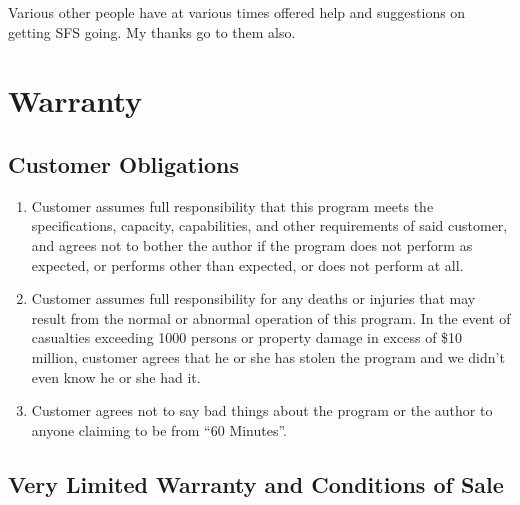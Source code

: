 Various other people have at various times offered help and suggestions on
getting SFS going.  My thanks go to them also.


\section{Warranty}

\subsection{Customer Obligations}

\begin{enumerate}

\item Customer assumes full responsibility that this program meets the
     specifications, capacity, capabilities, and other requirements of said
     customer, and agrees not to bother the author if the program does not
     perform as expected, or performs other than expected, or does not perform
     at all.

\item Customer assumes full responsibility for any deaths or injuries that may
     result from the normal or abnormal operation of this program.  In the
     event of casualties exceeding 1000 persons or property damage in excess of
     \$10 million, customer agrees that he or she has stolen the program and we
     didn't even know he or she had it.

\item Customer agrees not to say bad things about the program or the author to
     anyone claiming to be from ``60 Minutes''.
\end{enumerate}

\subsection{Very Limited Warranty and Conditions of Sale}

